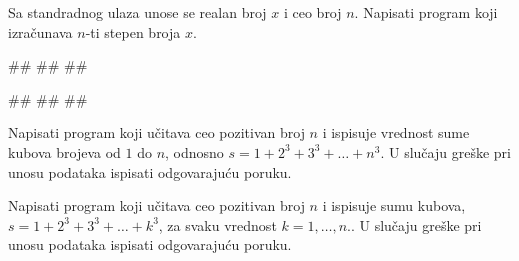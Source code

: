 \begin{Exercise}[label=p1.3_09]
 Sa standradnog ulaza unose se realan broj $x$ i ceo broj
 $n$. Napisati program koji izračunava $n$-ti stepen broja $x$. 
 
\begin{miditest}
\begin{upotreba}{1}
#\naslovInt#
##
##
\end{upotreba}
\end{miditest}
\begin{miditest}
\begin{upotreba}{2}
#\naslovInt#
##
##
\end{upotreba}
\end{miditest}
\end{Exercise}
\begin{Answer}[ref=p1.3_09]
\end{Answer}


\begin{Exercise}[label=v1.3_13] 
Napisati program koji učitava ceo pozitivan broj $n$ i ispisuje
vrednost sume kubova brojeva od $1$ do $n$, odnosno $s = 1+2^3+3^3+
\ldots +n^3$. U slučaju greške pri unosu podataka ispisati
odgovarajuću poruku. \\
\end{Exercise}
\begin{Answer}[ref=v1.3_13]
\end{Answer}

\begin{Exercise}[label=v1.3_13] 
Napisati program koji učitava ceo pozitivan broj $n$ i ispisuje sumu
kubova, $s = 1+2^3+3^3+ \ldots +k^3$, za svaku vrednost $k = 1,
\ldots, n$.. U slučaju greške pri unosu podataka ispisati odgovarajuću
poruku. \\ 
\end{Exercise}
\begin{Answer}[ref=v1.3_13]
\end{Answer}



